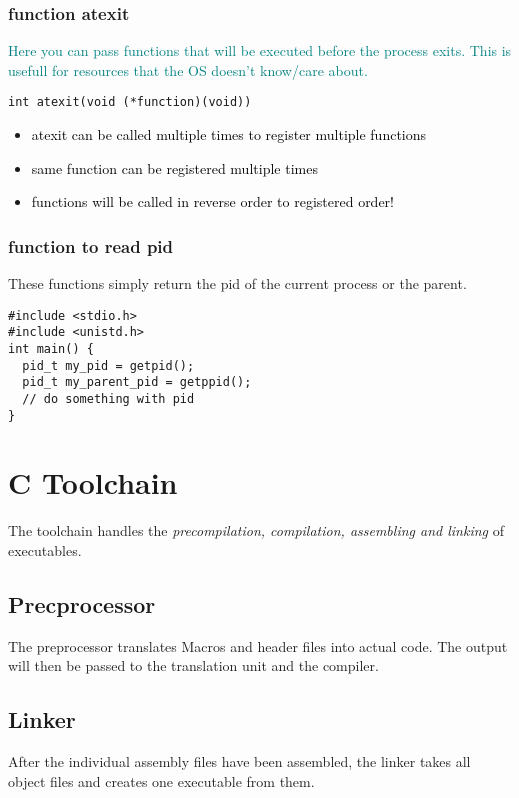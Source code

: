 \documentclass[main.tex,fontsize=8pt,paper=a4,paper=portrait,DIV=calc,]{scrartcl}
\begin{document}
\subsubsection{function atexit}
\textcolor{teal}{Here you can pass functions that will be executed before the process exits.\newline
This is usefull for resources that the OS doesn't know/care about.}
\begin{lstlisting}
int atexit(void (*function)(void))
\end{lstlisting}
\begin{itemize}
\item \textcolor{black}{atexit can be called multiple times to register multiple functions}
\item \textcolor{black}{same function can be registered multiple times}
\item \textcolor{black}{functions will be called in reverse order to registered order!}
\end{itemize} 

\subsubsection{function to read pid}
These functions simply return the pid of the current process or the parent.
\begin{lstlisting}
#include <stdio.h>
#include <unistd.h>
int main() {
  pid_t my_pid = getpid();
  pid_t my_parent_pid = getppid();
  // do something with pid
}
\end{lstlisting}

\section{C Toolchain}
The toolchain handles the \emph{precompilation, compilation, assembling and linking} of executables.

\subsection{Precprocessor}
The preprocessor translates Macros and header files into actual code.\newline
The output will then be passed to the translation unit and the compiler.

\subsection{Linker}
After the individual assembly files have been assembled, the linker takes all object files and creates one executable from them.
\end{document}
